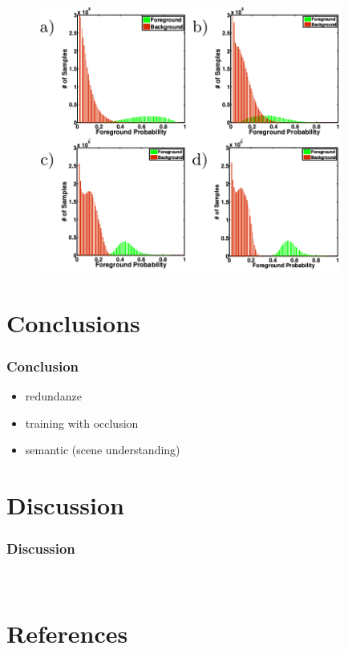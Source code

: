 \documentclass[xcolor=dvipsnames]{beamer}
\begin{document}
\begin{frame}
	\begin{figure}
	\includegraphics[width=10cm]{img/rir_1.png}
	\end{figure}
\end{frame}



\section{Conclusions}

\begin{frame}
	\frametitle{Conclusion}
	\Large

	\begin{itemize}
		\item redundanze
		\item training with occlusion
		\item semantic (scene understanding)
	\end{itemize}
\end{frame}

\section{Discussion}
{ 
\begin{frame}
	\frametitle{Discussion}
	\begin{center}
		{\fontsize{120}{48} \selectfont \textcolor{white}{?}}
	\end{center}
\end{frame}}

\section{References}
\begin{frame}[t,allowframebreaks]
	\nocite{*}
	\printbibliography
\end{frame}
\end{document}
